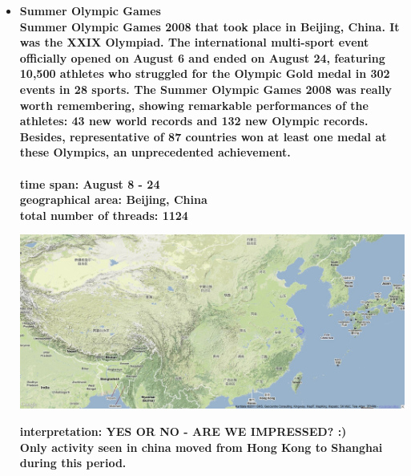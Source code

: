 \documentclass[11pt,a4paper,english]{article}
\begin{document}
\begin{itemize}
					\item \bf Summer Olympic Games \rm
						\\ Summer Olympic Games 2008 that took place in Beijing, China. It was the XXIX Olympiad. The international multi-sport event officially opened on August 6 and ended on August 24, featuring 10,500 athletes who struggled for the Olympic Gold medal in 302 events in 28 sports. The Summer Olympic Games 2008 was really worth remembering, showing remarkable performances of the athletes: 43 new world records and 132 new Olympic records. Besides, representative of 87 countries won at least one medal at these Olympics, an unprecedented achievement.
						\\\\ \bf time span: \rm August 8 - 24
						\\ \bf geographical area: \rm Beijing, China
						\\ \bf total number of threads: \rm 1124
					
						\includegraphics[width=130mm]{img/post-olympic}
						
						\bf interpretation: \rm YES OR NO - ARE WE IMPRESSED? :)
						\\ Only activity seen in china moved from Hong Kong to Shanghai during this period.
						
						
				\end{itemize}
			
\end{document}
